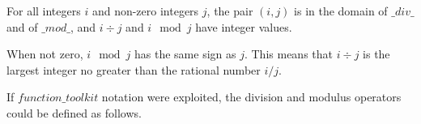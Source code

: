 \documentclass[draft,a4paper,10pt,wd]{isov2}
\begin{document}

For all integers $i$ and non-zero integers $j$,
the pair $(i, j)$ is in the domain of $\_ div \_$ and of $\_ mod \_$,
and $i \div j$ and $i \mod j$ have integer values.

When not zero, $i \mod j$ has the same sign as $j$.
This means that $i \div j$ is the largest integer no greater
than the rational number $i/j$.
\begin{note}
If $function\_toolkit$ notation were exploited,
the division and modulus operators could be defined as follows.
\end{note}
\end{document}
